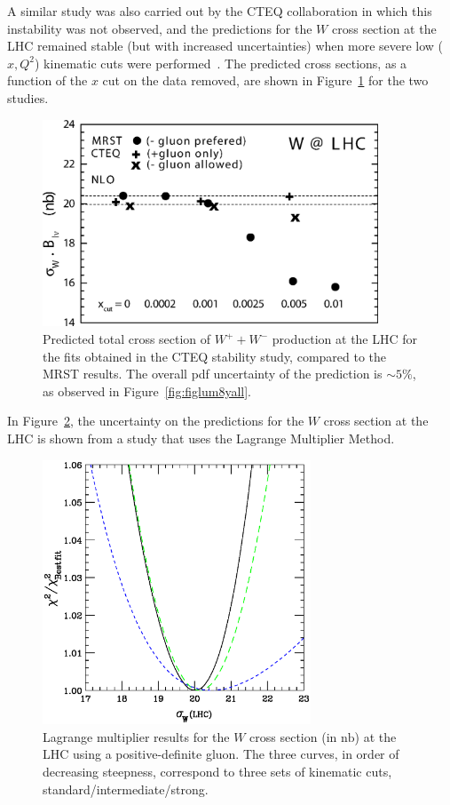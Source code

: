 \documentclass[12pt]{iopart}
\begin{document}
A similar study was also carried out by the CTEQ collaboration in which this  instability was not observed, and the
predictions  for the $W$ cross section at the LHC remained stable (but with increased uncertainties) when more severe low
($x,Q^2$) kinematic cuts were performed~\cite{Huston:2005jm}. The predicted cross sections, as a function of the $x$ cut on
the data removed, are shown in Figure~\ref{fig:WtotXs} for the two studies.
%
\begin{figure}[t]
\begin{center}
\includegraphics[width=10cm]{WLHC4ZZ.eps}
\end{center}
\caption{
Predicted total cross section of $W^+ + W^-$ production
at the LHC for the fits obtained in the CTEQ stability study, compared
to the MRST results. The overall pdf
uncertainty of the prediction is $\sim 5\%$, as observed in Figure~\ref{fig:figlum8yall}.} 
\label{fig:WtotXs}
\end{figure}
%
In Figure~\ref{fig:ChiVsSigCutsPG}, the uncertainty on the predictions for the $W$ cross section at the LHC is
shown from a study that uses the Lagrange Multiplier Method.
%
\begin{figure}[t]
\begin{center}
\includegraphics[width=8cm]{figLM5newx.eps}
\end{center}
\caption{
Lagrange multiplier results for the $W$ cross section 
(in $\mathrm{nb}$) at the LHC
using a positive-definite gluon. The three curves, in order of
decreasing steepness, correspond to  three sets of kinematic cuts,  standard/intermediate/strong.
\label{fig:ChiVsSigCutsPG}
}
\end{figure}
\end{document}

